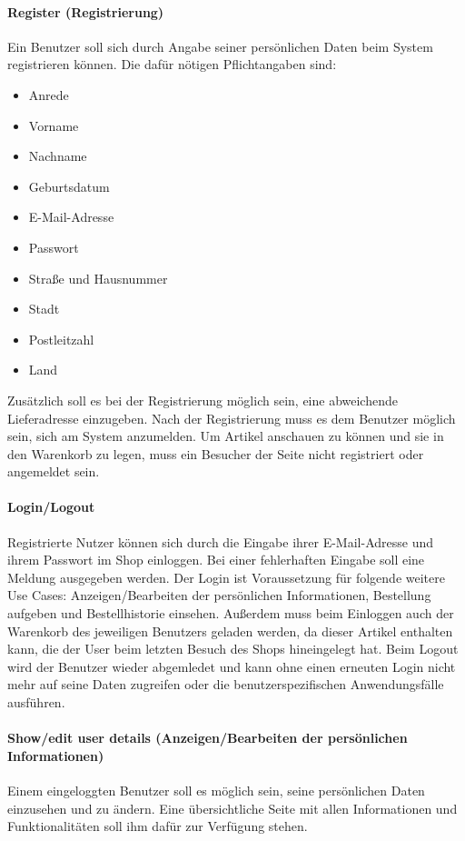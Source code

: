 \paragraph{Register (Registrierung)}
Ein Benutzer soll sich durch Angabe seiner persönlichen Daten beim System registrieren können.
Die dafür nötigen Pflichtangaben sind:
\begin{itemize}
\item Anrede
\item Vorname
\item Nachname
\item Geburtsdatum
\item E-Mail-Adresse
\item Passwort
\item Straße und Hausnummer
\item Stadt
\item Postleitzahl
\item Land
\end{itemize}
Zusätzlich soll es bei der Registrierung möglich sein, eine abweichende Lieferadresse einzugeben.
Nach der Registrierung muss es dem Benutzer möglich sein, sich am System anzumelden.
Um Artikel anschauen zu können und sie in den Warenkorb zu legen, muss ein Besucher der Seite nicht registriert oder angemeldet sein.

\paragraph{Login/Logout}
Registrierte Nutzer können sich durch die Eingabe ihrer E-Mail-Adresse und ihrem Passwort im Shop einloggen.
Bei einer fehlerhaften Eingabe soll eine Meldung ausgegeben werden.
Der Login ist Voraussetzung für folgende weitere Use Cases: Anzeigen/Bearbeiten der persönlichen Informationen, Bestellung aufgeben und Bestellhistorie einsehen.
Außerdem muss beim Einloggen auch der Warenkorb des jeweiligen Benutzers geladen werden, da dieser Artikel enthalten kann, die der User beim letzten Besuch des Shops hineingelegt hat.
Beim Logout wird der Benutzer wieder abgemledet und kann ohne einen erneuten Login nicht mehr auf seine Daten zugreifen oder die benutzerspezifischen Anwendungsfälle ausführen.

\paragraph{Show/edit user details (Anzeigen/Bearbeiten der persönlichen Informationen)}
Einem eingeloggten Benutzer soll es möglich sein, seine persönlichen Daten einzusehen und zu ändern.
Eine übersichtliche Seite mit allen Informationen und Funktionalitäten soll ihm dafür zur Verfügung stehen.

